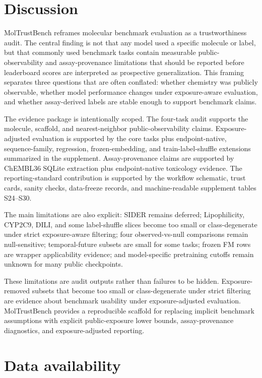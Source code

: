 \documentclass[unnumsec,webpdf,contemporary,large,numbered]{oup-authoring-template}
\begin{document}
\section{Discussion}

MolTrustBench reframes molecular benchmark evaluation as a trustworthiness audit. The central finding is not that any model used a specific molecule or label, but that commonly used benchmark tasks contain measurable public-observability and assay-provenance limitations that should be reported before leaderboard scores are interpreted as prospective generalization. This framing separates three questions that are often conflated: whether chemistry was publicly observable, whether model performance changes under exposure-aware evaluation, and whether assay-derived labels are stable enough to support benchmark claims.

The evidence package is intentionally scoped. The four-task audit supports the molecule, scaffold, and nearest-neighbor public-observability claims. Exposure-adjusted evaluation is supported by the core tasks plus endpoint-native, sequence-family, regression, frozen-embedding, and train-label-shuffle extensions summarized in the supplement. Assay-provenance claims are supported by ChEMBL36 SQLite extraction plus endpoint-native toxicology evidence. The reporting-standard contribution is supported by the workflow schematic, trust cards, sanity checks, data-freeze records, and machine-readable supplement tables S24--S30.

The main limitations are also explicit: SIDER remains deferred; Lipophilicity, CYP2C9, DILI, and some label-shuffle slices become too small or class-degenerate under strict exposure-aware filtering; four observed-vs-null comparisons remain null-sensitive; temporal-future subsets are small for some tasks; frozen FM rows are wrapper applicability evidence; and model-specific pretraining cutoffs remain unknown for many public checkpoints.

These limitations are audit outputs rather than failures to be hidden. Exposure-removed subsets that become too small or class-degenerate under strict filtering are evidence about benchmark usability under exposure-adjusted evaluation. MolTrustBench provides a reproducible scaffold for replacing implicit benchmark assumptions with explicit public-exposure lower bounds, assay-provenance diagnostics, and exposure-adjusted reporting.

\FloatBarrier

\section{Data availability}
\end{document}
